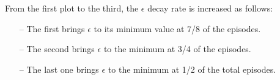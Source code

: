\documentclass{article}
\begin{document}
From the first plot to the third, the $\epsilon$ decay rate is increased as follows:

\begin{itemize}
\item[--] The first brings $\epsilon$ to its minimum value at 7/8 of the episodes.
\item[--] The second brings $\epsilon$ to the minimum at 3/4 of the episodes.
\item[--] The last one brings $\epsilon$ to the minimum at 1/2 of the total episodes.
\end{itemize}


\begin{center}
\centering
{}
\end{center}

\begin{center}
\centering
{}
\end{center}

\begin{center}
\centering
{}
\end{center}
\end{document}
